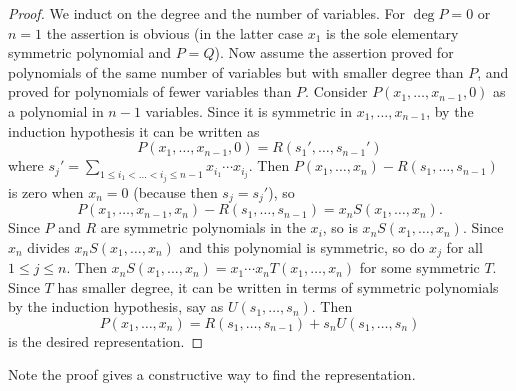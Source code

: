 \begin{proof}
We induct on the degree and the number of variables. For $\deg P=0$ or $n=1$ the assertion is obvious (in the latter case $x_1$ is the sole elementary symmetric polynomial and $P=Q$). Now assume the assertion proved for polynomials of the same number of variables but with smaller degree than $P$, and proved for polynomials of fewer variables than $P$. Consider $P(x_1,\ldots, x_{n-1},0)$ as a polynomial in $n-1$ variables. Since it is symmetric in $x_1,\ldots, x_{n-1}$, by the induction hypothesis it can be written as
\[
P(x_1,\ldots, x_{n-1},0)=R(s_1',\ldots,s_{n-1}')
\]
where $s_j'=\sum_{1\leq i_1<\ldots<i_j\leq n-1}x_{i_1}\cdots x_{i_j}$. Then
$P(x_1,\ldots, x_{n})-R(s_1,\ldots, s_{n-1})$ is zero when $x_n=0$ (because then $s_j=s_j'$), so
\[
P(x_1,\ldots, x_{n-1},x_n)-R(s_1,\ldots,s_{n-1})=x_nS(x_1,\ldots, x_n).
\]
Since $P$ and $R$ are symmetric polynomials in the $x_i$, so is $x_nS(x_1,\ldots, x_n)$. Since $x_n$ divides $x_nS(x_1,\ldots, x_n)$ and this polynomial is symmetric, so do $x_j$ for all $1\leq j\leq n$. Then $x_nS(x_1,\ldots, x_n)=x_1\cdots x_nT(x_1,\ldots, x_n)$ for some symmetric $T$. Since $T$ has smaller degree, it can be written in terms of symmetric polynomials by the induction hypothesis, say as $U(s_1,\ldots, s_n)$. Then 
\[
P(x_1,\ldots, x_n)=R(s_1,\ldots, s_{n-1})+s_nU(s_1,\ldots, s_n)
\]
is the desired representation.
\end{proof}
Note the proof gives a constructive way to find the representation.

